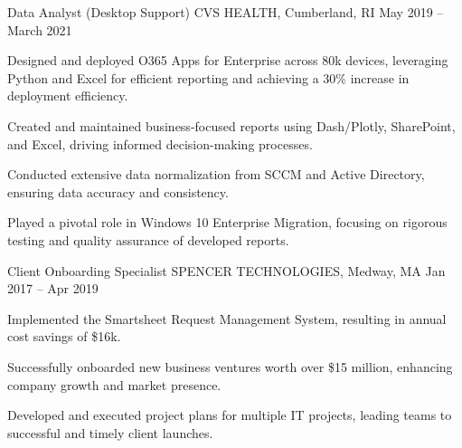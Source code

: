 \begin{cventries}
\cventry
{Data Analyst (Desktop Support)} %
{CVS HEALTH, Cumberland, RI} %
{} %
{May 2019 – March 2021} %
{ %
\begin{cvitems}
\item {Designed and deployed O365 Apps for Enterprise across 80k devices, leveraging Python and Excel for efficient reporting and achieving a 30\% increase in deployment efficiency.}
\item {Created and maintained business-focused reports using Dash/Plotly, SharePoint, and Excel, driving informed decision-making processes.}
\item {Conducted extensive data normalization from SCCM and Active Directory, ensuring data accuracy and consistency.}
\item {Played a pivotal role in Windows 10 Enterprise Migration, focusing on rigorous testing and quality assurance of developed reports.}
\end{cvitems}
}


\cventry
{Client Onboarding Specialist} %
{SPENCER TECHNOLOGIES, Medway, MA} %
{} %
{Jan 2017 – Apr 2019} %
{ %
\begin{cvitems}
\item {Implemented the Smartsheet Request Management System, resulting in annual cost savings of \$16k.}
\item {Successfully onboarded new business ventures worth over \$15 million, enhancing company growth and market presence.}
\item {Developed and executed project plans for multiple IT projects, leading teams to successful and timely client launches.}
\end{cvitems}
}


\end{cventries}
